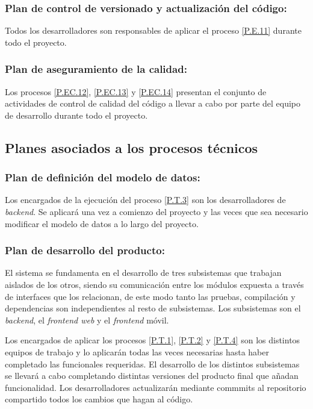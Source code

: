 \documentclass{article}
\begin{document}
\subsubsection{Plan de control de versionado y actualización del código: } \label{PL.EC.9}

Todos los desarrolladores son responsables de aplicar el proceso \ref{P.E.11} durante todo el proyecto.

\subsubsection{Plan de aseguramiento de la calidad:} \label{PL.EC.10}

Los procesos \ref{P.EC.12}, \ref{P.EC.13} y \ref{P.EC.14} presentan el conjunto de actividades de control de calidad del código a llevar a cabo por parte del equipo de desarrollo durante todo el proyecto.

\subsection{Planes asociados a los procesos técnicos}

\subsubsection{Plan de definición del modelo de datos:} \label{PL.T.1}
Los encargados de la ejecución del proceso \ref{P.T.3} son los desarrolladores de \textit{backend}. Se aplicará una vez a comienzo del proyecto y las veces que sea necesario modificar el modelo de datos a lo largo del proyecto.

\subsubsection{Plan de desarrollo del producto: } \label{PL.T.2}

El sistema se fundamenta en el desarrollo de tres subsistemas que trabajan aislados de los otros, siendo su comunicación entre los módulos expuesta a través de interfaces que los relacionan, de este modo tanto las pruebas, compilación y dependencias son independientes al resto de subsistemas. Los subsistemas son el \textit{backend}, el \textit{frontend web} y el \textit{frontend} móvil. 

Los encargados de aplicar los procesos \ref{P.T.1}, \ref{P.T.2} y \ref{P.T.4}  son los distintos equipos de trabajo y lo aplicarán todas las veces necesarias hasta haber completado las funcionales requeridas. El desarrollo de los distintos subsistemas se llevará a cabo completando distintas versiones del producto final que añadan funcionalidad. Los desarrolladores actualizarán mediante commmits al repositorio compartido todos los cambios que hagan al código.
\end{document}
